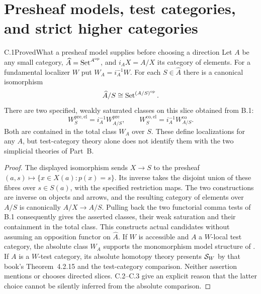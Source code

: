 \section{Presheaf models, test categories, and strict higher categories}

\begin{claim}{C.1}{Proved}{What a presheaf model supplies before choosing a direction}
Let $A$ be any small category, $\widehat A=\operatorname{Set}^{A^{\mathrm{op}}}$,
and $i_A X=A/X$ its category of elements. For a fundamental localizer $W$
put $W_A=i_A^{-1}W$. For each $S\in\widehat A$ there is a canonical
isomorphism
\[
 \widehat A/S\cong\operatorname{Set}^{(A/S)^{\mathrm{op}}}.
\]
There are two specified, weakly saturated classes on this slice obtained
from B.1:
\[
 W^{\mathrm{pre,el}}_S=i_A^{-1}W^{\mathrm{pre}}_{A/S},\qquad
 W^{\mathrm{co,el}}_S=i_A^{-1}W^{\mathrm{co}}_{A/S}.
\]
Both are contained in the total class $W_A$ over $S$. These define
localizations for any $A$, but test-category theory alone does not identify
them with the two simplicial theories of Part~B.
\end{claim}
\begin{proof}
The displayed isomorphism sends $X\to S$ to the presheaf
$(a,s)\mapsto\{x\in X(a):p(x)=s\}$. Its inverse takes the disjoint union
of these fibres over $s\in S(a)$, with the specified restriction maps.
The two constructions are inverse on objects and arrows, and the resulting
category of elements over $A/S$ is canonically $A/X\to A/S$.
Pulling back the two functorial comma tests of B.1 consequently gives the
asserted classes, their weak saturation and their containment in the total
class. This constructs actual candidates without assuming an opposition
functor on $\widehat A$.
If $W$ is accessible and $A$ a $W$-local test category, the absolute
class $W_A$ supports the monomorphism model structure of
\citet[Corollary 4.2.18]{BCCisinski2006}. If $A$ is a $W$-test category,
its absolute homotopy theory presents $\mathcal S_W$ by that book's
Theorem~4.2.15 and the test-category comparison. Neither assertion mentions
or chooses directed slices. C.2--C.3 give an explicit reason that the latter
choice cannot be silently inferred from the absolute comparison.
\end{proof}

